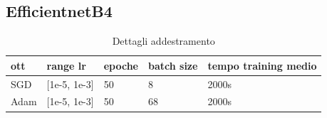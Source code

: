 \subsection{EfficientnetB4}

\begin{table}[H]
\centering
\caption{Dettagli addestramento}
\begin{tabular}{|l|l|l|l|l|}
\hline
\textbf{ott} & \textbf{range lr} & \textbf{epoche} & \textbf{batch size} & \textbf{tempo training medio} \\ \hline
SGD          & {[}1e-5, 1e-3{]}   & 50              & 8                   & 2000s                         \\ \hline
Adam         & {[}1e-5, 1e-3{]}  & 50              & 68                  & 2000s                         \\ \hline
\end{tabular}
\end{table}
